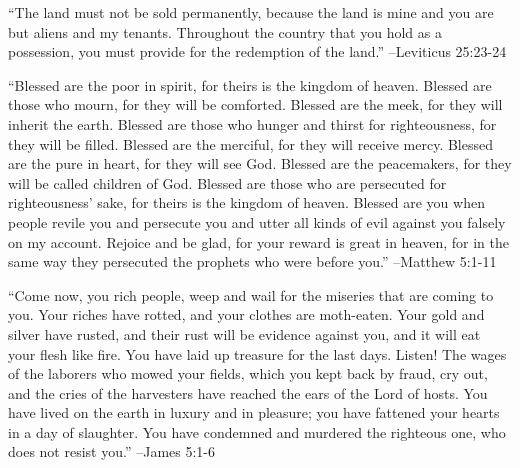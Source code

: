 \documentclass{article}%
\begin{document}
\linebreak%
\vspace{1mm}%
\begin{minipage}{\textwidth}%
\flushleft%
“The land must not be sold permanently, because the land is mine and you are but aliens and my tenants. Throughout the country that you hold as a possession, you must provide for the redemption of the land.”%
\linebreak%
\vspace{1mm}%
–Leviticus 25:23{-}24%
\linebreak%
\vspace{1mm}%
\end{minipage}%
\linebreak%
\vspace{1mm}%
\begin{minipage}{\textwidth}%
\flushleft%
“Blessed are the poor in spirit, for theirs is the kingdom of heaven. Blessed are those who mourn, for they will be comforted. Blessed are the meek, for they will inherit the earth. Blessed are those who hunger and thirst for righteousness, for they will be filled. Blessed are the merciful, for they will receive mercy. Blessed are the pure in heart, for they will see God. Blessed are the peacemakers, for they will be called children of God. Blessed are those who are persecuted for righteousness’ sake, for theirs is the kingdom of heaven. Blessed are you when people revile you and persecute you and utter all kinds of evil against you falsely on my account. Rejoice and be glad, for your reward is great in heaven, for in the same way they persecuted the prophets who were before you.”%
\linebreak%
\vspace{1mm}%
–Matthew 5:1{-}11%
\linebreak%
\vspace{1mm}%
\end{minipage}%
\linebreak%
\vspace{1mm}%
\begin{minipage}{\textwidth}%
\flushleft%
“Come now, you rich people, weep and wail for the miseries that are coming to you. Your riches have rotted, and your clothes are moth{-}eaten. Your gold and silver have rusted, and their rust will be evidence against you, and it will eat your flesh like fire. You have laid up treasure for the last days. Listen! The wages of the laborers who mowed your fields, which you kept back by fraud, cry out, and the cries of the harvesters have reached the ears of the Lord of hosts. You have lived on the earth in luxury and in pleasure; you have fattened your hearts in a day of slaughter. You have condemned and murdered the righteous one, who does not resist you.”%
\linebreak%
\vspace{1mm}%
–James 5:1{-}6%
\linebreak%
\vspace{1mm}%
\end{minipage}%
\end{document}
